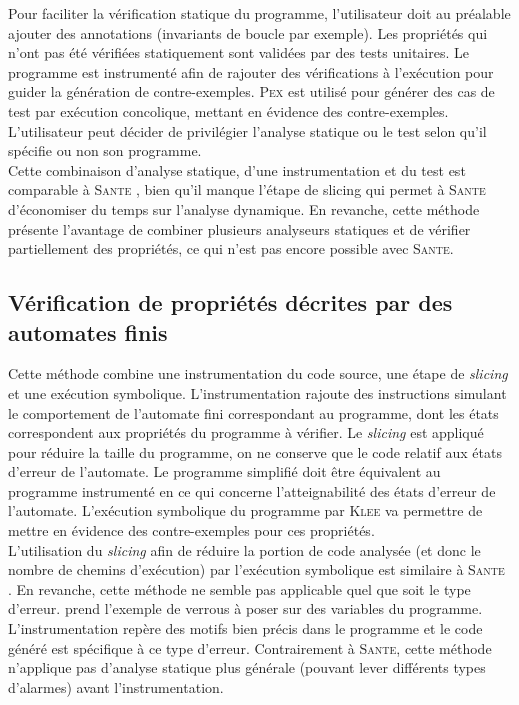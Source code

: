 Pour faciliter la vérification statique du programme, l'utilisateur doit au
préalable ajouter des annotations (invariants de boucle par exemple). Les
propriétés qui n'ont pas été vérifiées statiquement sont validées par des tests
unitaires. Le programme est instrumenté afin de rajouter des vérifications à
l'exécution pour guider la génération de contre-exemples. \textsc{Pex}
\cite{PEX} est utilisé pour générer des cas de test par exécution concolique,
mettant en évidence des contre-exemples. L'utilisateur peut décider de
privilégier l'analyse statique ou le test selon qu'il spécifie ou non son
programme.\\

Cette combinaison d'analyse statique, d'une instrumentation et du test est
comparable à \textsc{Sante} \cite{SANTE}, bien qu'il manque l'étape de slicing
qui permet à \textsc{Sante} d'économiser du temps sur l'analyse dynamique. En
revanche, cette méthode présente l'avantage de combiner plusieurs analyseurs
statiques et de vérifier partiellement des propriétés, ce qui n'est pas encore
possible avec \textsc{Sante}.

\subsection{Vérification de propriétés décrites par des automates finis}

Cette méthode \cite{checking-prop-state-machines} combine une instrumentation du
code source, une étape de {\em slicing} et une exécution symbolique.
L'instrumentation rajoute des instructions simulant le comportement de
l'automate fini correspondant au programme, dont les états correspondent aux
propriétés du programme à vérifier.
Le {\em slicing} est appliqué pour réduire la taille du programme, on ne
conserve que le code relatif aux états d'erreur de l'automate. Le programme
simplifié doit être équivalent au programme instrumenté en ce qui concerne
l'atteignabilité des états d'erreur de l'automate.
L'exécution symbolique du programme par \textsc{Klee} \cite{KLEE} va permettre
de mettre en évidence des contre-exemples pour ces propriétés.\\

L'utilisation du {\em slicing} afin de réduire la portion de code analysée
(et donc le nombre de chemins d'exécution) par l'exécution symbolique est
similaire à \textsc{Sante} \cite{SANTE}. En revanche, cette méthode ne semble
pas applicable quel que soit le type d'erreur.
\cite{checking-prop-state-machines} prend l'exemple de verrous à poser sur des
variables du programme. L'instrumentation repère des motifs bien précis dans le
programme et le code généré est spécifique à ce type d'erreur. Contrairement à
\textsc{Sante}, cette méthode n'applique pas d'analyse statique plus générale
(pouvant lever différents types d'alarmes) avant l'instrumentation.

